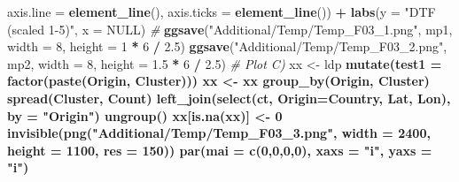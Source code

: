 \documentclass[
]{article}
\newenvironment{Shaded}{\begin{snugshade}}{\end{snugshade}}
\newcommand{\CommentTok}[1]{\textcolor[rgb]{0.56,0.35,0.01}{\textit{#1}}}
\newcommand{\DataTypeTok}[1]{\textcolor[rgb]{0.13,0.29,0.53}{#1}}
\newcommand{\DecValTok}[1]{\textcolor[rgb]{0.00,0.00,0.81}{#1}}
\newcommand{\FloatTok}[1]{\textcolor[rgb]{0.00,0.00,0.81}{#1}}
\newcommand{\KeywordTok}[1]{\textcolor[rgb]{0.13,0.29,0.53}{\textbf{#1}}}
\newcommand{\NormalTok}[1]{#1}
\newcommand{\OperatorTok}[1]{\textcolor[rgb]{0.81,0.36,0.00}{\textbf{#1}}}
\newcommand{\OtherTok}[1]{\textcolor[rgb]{0.56,0.35,0.01}{#1}}
\newcommand{\StringTok}[1]{\textcolor[rgb]{0.31,0.60,0.02}{#1}}
\begin{document}
\begin{Shaded}
\begin{Highlighting}[]
{{{{{{{{{{{{{{{{{{{{{{        \DataTypeTok{axis.line =} \KeywordTok{element_line}\NormalTok{(), }\DataTypeTok{axis.ticks =} \KeywordTok{element_line}\NormalTok{()) }\OperatorTok{+}
\StringTok{  }\KeywordTok{labs}\NormalTok{(}\DataTypeTok{y =} \StringTok{"DTF (scaled 1-5)"}\NormalTok{, }\DataTypeTok{x =} \OtherTok{NULL}\NormalTok{)}
\CommentTok{#}
\KeywordTok{ggsave}\NormalTok{(}\StringTok{"Additional/Temp/Temp_F03_1.png"}\NormalTok{, mp1, }\DataTypeTok{width =} \DecValTok{8}\NormalTok{, }\DataTypeTok{height =}   \DecValTok{1} \OperatorTok{*}\StringTok{ }\DecValTok{6} \OperatorTok{/}\StringTok{ }\FloatTok{2.5}\NormalTok{)}
\KeywordTok{ggsave}\NormalTok{(}\StringTok{"Additional/Temp/Temp_F03_2.png"}\NormalTok{, mp2, }\DataTypeTok{width =} \DecValTok{8}\NormalTok{, }\DataTypeTok{height =} \FloatTok{1.5} \OperatorTok{*}\StringTok{ }\DecValTok{6} \OperatorTok{/}\StringTok{ }\FloatTok{2.5}\NormalTok{)}
\CommentTok{# Plot C)}
\NormalTok{xx <-}\StringTok{ }\NormalTok{ldp }\OperatorTok{%
\StringTok{  }\KeywordTok{mutate}\NormalTok{(}\DataTypeTok{test1 =} \KeywordTok{factor}\NormalTok{(}\KeywordTok{paste}\NormalTok{(Origin, Cluster)))}
\NormalTok{xx <-}\StringTok{ }\NormalTok{xx }\OperatorTok{%
\StringTok{  }\KeywordTok{group_by}\NormalTok{(Origin, Cluster) }\OperatorTok{%
\StringTok{  }\KeywordTok{spread}\NormalTok{(Cluster, Count) }\OperatorTok{%
\StringTok{  }\KeywordTok{left_join}\NormalTok{(}\KeywordTok{select}\NormalTok{(ct, }\DataTypeTok{Origin=}\NormalTok{Country, Lat, Lon), }\DataTypeTok{by =} \StringTok{"Origin"}\NormalTok{) }\OperatorTok{%
\StringTok{  }\KeywordTok{ungroup}\NormalTok{() }\OperatorTok{%
\NormalTok{xx[}\KeywordTok{is.na}\NormalTok{(xx)] <-}\StringTok{ }\DecValTok{0} 
\KeywordTok{invisible}\NormalTok{(}\KeywordTok{png}\NormalTok{(}\StringTok{"Additional/Temp/Temp_F03_3.png"}\NormalTok{, }\DataTypeTok{width =} \DecValTok{2400}\NormalTok{, }\DataTypeTok{height =} \DecValTok{1100}\NormalTok{, }\DataTypeTok{res =} \DecValTok{150}\NormalTok{))}
\KeywordTok{par}\NormalTok{(}\DataTypeTok{mai =} \KeywordTok{c}\NormalTok{(}\DecValTok{0}\NormalTok{,}\DecValTok{0}\NormalTok{,}\DecValTok{0}\NormalTok{,}\DecValTok{0}\NormalTok{), }\DataTypeTok{xaxs =} \StringTok{"i"}\NormalTok{, }\DataTypeTok{yaxs =} \StringTok{"i"}\NormalTok{)}
}}}}}}}}}}}}}}}}}}}}}}}}}}}}
\end{Highlighting}
\end{Shaded}
\end{document}
